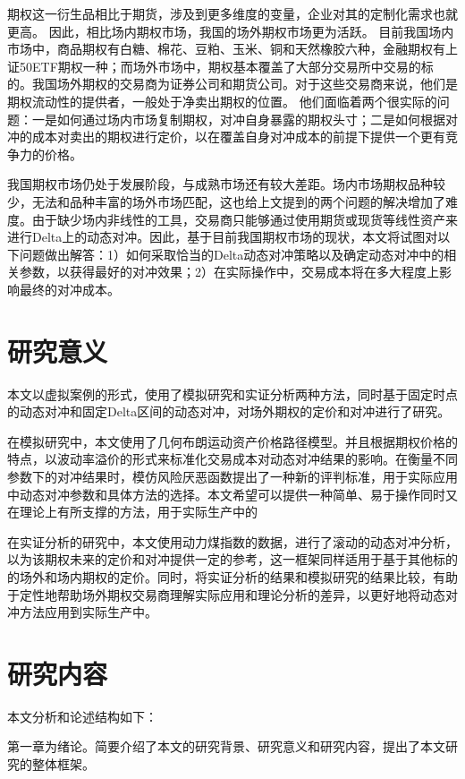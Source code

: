 期权这一衍生品相比于期货，涉及到更多维度的变量，企业对其的定制化需求也就更高。
因此，相比场内期权市场，我国的场外期权市场更为活跃。
目前我国场内市场中，商品期权有白糖、棉花、豆粕、玉米、铜和天然橡胶六种，金融期权有上证50ETF期权一种；而场外市场中，期权基本覆盖了大部分交易所中交易的标的。我国场外期权的交易商为证券公司和期货公司。对于这些交易商来说，他们是期权流动性的提供者，一般处于净卖出期权的位置。
他们面临着两个很实际的问题：一是如何通过场内市场复制期权，对冲自身暴露的期权头寸；二是如何根据对冲的成本对卖出的期权进行定价，以在覆盖自身对冲成本的前提下提供一个更有竞争力的价格。

我国期权市场仍处于发展阶段，与成熟市场还有较大差距。场内市场期权品种较少，无法和品种丰富的场外市场匹配，这也给上文提到的两个问题的解决增加了难度。由于缺少场内非线性的工具，交易商只能够通过使用期货或现货等线性资产来进行Delta上的动态对冲。因此，基于目前我国期权市场的现状，本文将试图对以下问题做出解答：1）如何采取恰当的Delta动态对冲策略以及确定动态对冲中的相关参数，以获得最好的对冲效果；2）在实际操作中，交易成本将在多大程度上影响最终的对冲成本。

\section{研究意义}

本文以虚拟案例的形式，使用了模拟研究和实证分析两种方法，同时基于固定时点的动态对冲和固定Delta区间的动态对冲，对场外期权的定价和对冲进行了研究。

在模拟研究中，本文使用了几何布朗运动资产价格路径模型。并且根据期权价格的特点，以波动率溢价的形式来标准化交易成本对动态对冲结果的影响。在衡量不同参数下的对冲结果时，模仿风险厌恶函数提出了一种新的评判标准，用于实际应用中动态对冲参数和具体方法的选择。本文希望可以提供一种简单、易于操作同时又在理论上有所支撑的方法，用于实际生产中的

在实证分析的研究中，本文使用动力煤指数的数据，进行了滚动的动态对冲分析，以为该期权未来的定价和对冲提供一定的参考，这一框架同样适用于基于其他标的的场外和场内期权的定价。同时，将实证分析的结果和模拟研究的结果比较，有助于定性地帮助场外期权交易商理解实际应用和理论分析的差异，以更好地将动态对冲方法应用到实际生产中。

\section{研究内容}

本文分析和论述结构如下：

第一章为绪论。简要介绍了本文的研究背景、研究意义和研究内容，提出了本文研究的整体框架。

